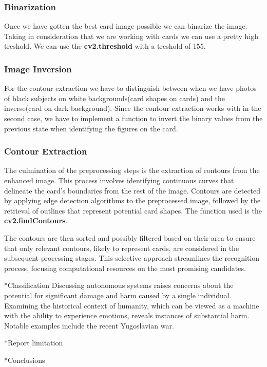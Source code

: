 \documentclass[twocolumn, a4paper,10pt]{article}
\makeatletter
\renewcommand\section{\@startsection{section}{1}{\z@}{3pt}{3pt}{\normalfont\large\bfseries}}
\renewcommand\subsection{\@startsection{subsection}{1}{\z@}{\z@}{\z@}{\normalfont\normalsize\bfseries}}
\renewcommand\subsection{\@startsection{subsection}{1}{\z@}{\z@}{0.1pt}{\normalfont\normalsize\bfseries}}
\makeatother
\begin{document}
\subsubsection*{Binarization}
Once we have gotten the best card image possible we can binarize the image. Taking in consideration that we are working with cards we can use a pretty high treshold. We can use the \textbf{cv2.threshold}  with a treshold of 155.

\subsubsection*{Image Inversion}
For the contour extraction we have to distinguish between when we have photos of black subjects on white backgrounds(card shapes on cards) and the inverse(card on dark background).
Since the contour extraction works with in the second case, we have to implement a function to invert the binary values from the previous state when identifying the figures on the card.

 \subsubsection*{Contour Extraction}
The culmination of the preprocessing steps is the extraction of contours from the enhanced image. This process involves identifying continuous curves that delineate the card's boundaries from the rest of the image. Contours are detected by applying edge detection algorithms to the preprocessed image, followed by the retrieval of outlines that represent potential card shapes. The function used is the \textbf{cv2.findContours}.

The contours are then sorted and possibly filtered based on their area to ensure that only relevant contours, likely to represent cards, are considered in the subsequent processing stages. This selective approach streamlines the recognition process, focusing computational resources on the most promising candidates.

\subsection*{Classification}
Discussing autonomous systems raises concerns about the potential for significant damage and harm caused by a single individual. Examining the historical context of humanity, which can be viewed as a machine with the ability to experience emotions, reveals instances of substantial harm. Notable examples include the recent Yugoslavian war.

\section*{Report limitation}

\section*{Conclusions}

\nocite{*}

\newpage
\onecolumn
\end{document}
